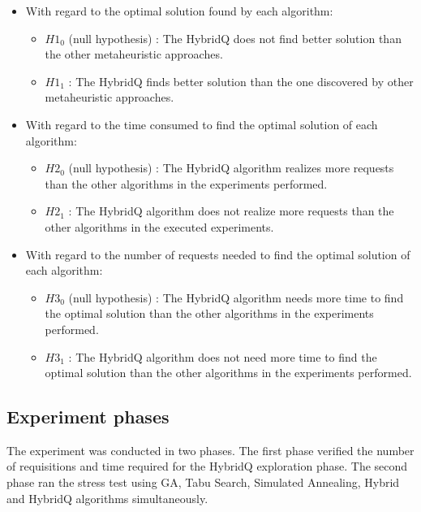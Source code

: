 \documentclass{report}
\begin{document}
\begin{itemize}
\item With regard to the optimal solution found by each algorithm:
\begin{itemize}
\item $H1_{0}$ (null hypothesis) : The HybridQ does not find better solution than the other metaheuristic approaches.
\item $H1_{1}$  : The HybridQ finds better solution than the one discovered by other metaheuristic approaches.
\end{itemize}
\end{itemize}


\begin{itemize}
\item With regard to the time consumed to find the optimal solution of each algorithm:
\begin{itemize}
\item $H2_{0}$ (null hypothesis) : The HybridQ algorithm realizes more requests than the other algorithms in the experiments performed.
\item $H2_{1}$  : The HybridQ algorithm does not realize more requests than the other algorithms in the executed experiments.
\end{itemize}
\end{itemize}


\begin{itemize}
\item With regard to the number of requests needed to find the optimal solution of each algorithm:
\begin{itemize}
\item $H3_{0}$ (null hypothesis) : The HybridQ algorithm needs more time to find the optimal solution than the other algorithms in the experiments performed.
\item $H3_{1}$  : The HybridQ algorithm does not need more time to find the optimal solution than the other algorithms in the experiments performed.
\end{itemize}
\end{itemize}

\subsection{Experiment phases}

The experiment was conducted in two phases. The first phase verified the number of requisitions and time required for the HybridQ exploration phase. The second phase ran the stress test using GA, Tabu Search, Simulated Annealing, Hybrid and HybridQ algorithms simultaneously.
\end{document}
